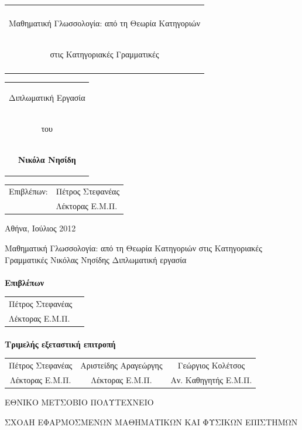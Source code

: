 \documentclass [a4paper,11pt] {book}
\theoremstyle{definition}
\theoremstyle{definition}
\begin{document}
\begin{titlepage}
\begin{center}
\vfill
\begin{tabular}{c}
\hline \\
\begin{LARGE}Μαθηματική Γλωσσολογία: από τη Θεωρία Κατηγοριών\end{LARGE} \\ \begin{LARGE}στις Κατηγοριακές Γραμματικές\end{LARGE}\\
\\
\hline
\end{tabular}
\vfill
\begin{tabular}{c}
\begin{large}
Διπλωματική Εργασία
\end{large}
\\
\begin{large}
του
\end{large}
\\
\begin{large}
\textbf{Νικόλα Νησίδη}
\end{large}
\end{tabular}
\vfill
\end{center}
\begin{tabular}{ll}
Επιβλέπων: & Πέτρος Στεφανέας \\ 
 & Λέκτορας Ε.Μ.Π. \\ 
\end{tabular}
\begin{center}
Αθήνα, Ιούλιος 2012
\end{center}
\cleardoublepage
{}
\thispagestyle{empty}
\begin{center}
\Large{Μαθηματική Γλωσσολογία: από τη Θεωρία Κατηγοριών στις Κατηγοριακές Γραμματικές}
\vfill
\large{Νικόλας Νησίδης}
\vfill
Διπλωματική εργασία
\vfill
\end{center}
\paragraph{}
\textbf{Επιβλέπων}

\begin{tabular}{ll}
Πέτρος Στεφανέας \\
Λέκτορας Ε.Μ.Π.
\end{tabular}
\paragraph{}
\textbf{Τριμελής εξεταστική επιτροπή}
\begin{center}
\begin{tabular}{ccc}
Πέτρος Στεφανέας & Αριστείδης Αραγεώργης& Γεώργιος Κολέτσος \\
Λέκτορας Ε.Μ.Π. & Λέκτορας Ε.Μ.Π. & Αν. Καθηγητής Ε.Μ.Π. 
\end{tabular}
\end{center}
\vfill

\Large{Ε}\large{ΘΝΙΚΟ} \Large{Μ}\large{ΕΤΣΟΒΙΟ} \Large{Π}\large{ΟΛΥΤΕΧΝΕΙΟ}

\Large{Σ}\large{ΧΟΛΗ} \Large{Ε}\large{ΦΑΡΜΟΣΜΕΝΩΝ} \Large{Μ}\large{ΑΘΗΜΑΤΙΚΩΝ ΚΑΙ} \Large{Φ}\large{ΥΣΙΚΩΝ} \Large{Ε}\large{ΠΙΣΤΗΜΩΝ}\end{titlepage}
\end{document}
